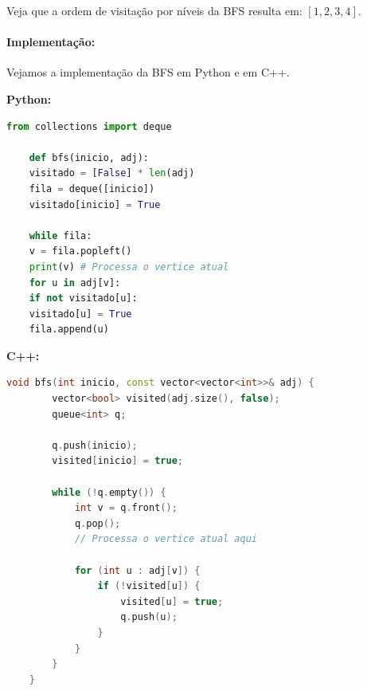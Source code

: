 
Veja que a ordem de visitação por níveis da BFS resulta em: $[1, 2, 3,
		4]$.\\\newpage

\paragraph{Implementação: }\mbox{}
Vejamos a implementação da BFS em Python e em C++.

\textbf{Python: }
\begin{lstlisting}[language=Python]
	from collections import deque
	
	def bfs(inicio, adj):
	visitado = [False] * len(adj)
	fila = deque([inicio])
	visitado[inicio] = True
	
	while fila:
	v = fila.popleft()
	print(v) # Processa o vertice atual
	for u in adj[v]:
	if not visitado[u]:
	visitado[u] = True
	fila.append(u)
\end{lstlisting}

\vspace{0.3cm}
\textbf{C++:}
\begin{lstlisting}[language=C++]
	void bfs(int inicio, const vector<vector<int>>& adj) {
		vector<bool> visited(adj.size(), false);
		queue<int> q;
		
		q.push(inicio);
		visited[inicio] = true;
		
		while (!q.empty()) {
			int v = q.front();
			q.pop();
			// Processa o vertice atual aqui
			
			for (int u : adj[v]) {
				if (!visited[u]) {
					visited[u] = true;
					q.push(u);
				}
			}
		}
	}
\end{lstlisting}